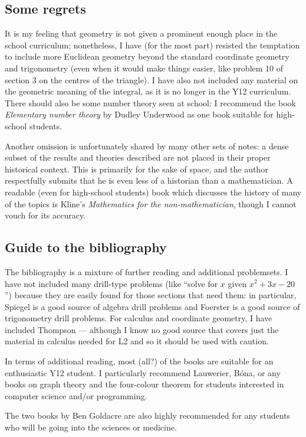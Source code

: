 \subsection*{Some regrets}
It is my feeling that geometry is not given a prominent enough place in the school curriculum; nonetheless, I have (for the most part) resisted
the temptation to include more Euclidean geometry beyond the standard coordinate geometry and trigonometry (even when it would make things easier,
like problem 10 of section 3 on the centres of the triangle). I have also not included any material on the geometric meaning of the integral, as
it is no longer in the Y12 curriculum. There should also be some number theory seen at school: I recommend the book \emph{Elementary number theory} by Dudley Underwood
as one book suitable for high-school students.

Another omission is unfortunately shared by many other sets of notes: a dense subset of the results and theories described are not placed in their
proper historical context. This is primarily for the sake of space, and the author respectfully submits that he is even less of a historian than
a mathematician. A readable (even for high-school students) book which discusses the history of many of the topics is Kline's \emph{Mathematics
for the non-mathematician}, though I cannot vouch for its accuracy.

\subsection*{Guide to the bibliography}
The bibliography is a mixture of further reading and additional problemsets. I have not included many drill-type problems
(like ``solve for $ x $ given $ x^2 + 3x - 20 $'') because they are easily found for those sections that need them: in particular,
Spiegel is a good source of algebra drill problems and Foerster is a good source of trigonometry drill problems. For calculus
and coordinate geometry, I have included Thompson --- although I know no good source that covers just the material in calculus needed
for L2 and so it should be used with caution.

In terms of additional reading, most (all?) of the books are suitable for an enthusiastic Y12 student. I particularly recommend
Lauwerier, B\'ona, or any books on graph theory and the four-colour theorem for students interested in computer science and/or programming.

The two books by Ben Goldacre are also highly recommended for any students who will be going into the sciences or medicine.

